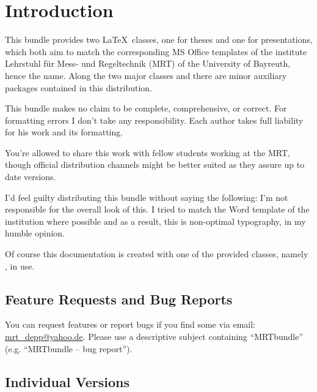 \chapter{Introduction}
This bundle provides two \LaTeX\ classes, one for theses and one for
presentations, which both aim to match the corresponding MS Office templates of
the institute Lehrstuhl für Mess- und Regeltechnik (MRT) of the University of
Bayreuth, hence the name. Along the two major classes  and
 there are minor auxiliary packages contained in this distribution.

This bundle makes no claim to be complete, comprehensive, or correct. For
formatting errors I don't take any responsibility. Each author takes full
liability for his work and its formatting.

You're allowed to share this work with fellow students working at the MRT,
though official distribution channels might be better suited as they assure up
to date versions.

I'd feel guilty distributing this bundle without saying the following: I'm not
responsible for the overall look of this. I tried to match the Word template of
the institution where possible and as a result, this is non-optimal typography,
in my humble opinion.

Of course this documentation is created with one of the provided classes, namely
, in use.

\section{Feature Requests and Bug Reports}\label{sec:bugs}
You can request features or report bugs if you find some via email:
\href{mailto:mrt_depp@yahoo.de?subject=MRTbundle -- bug report}
  {mrt\_depp@yahoo.de}.
Please use a descriptive subject containing ``MRTbundle'' (e.g. ``MRTbundle --
bug report'').

\section{Individual Versions}
\docIndividualVersions
